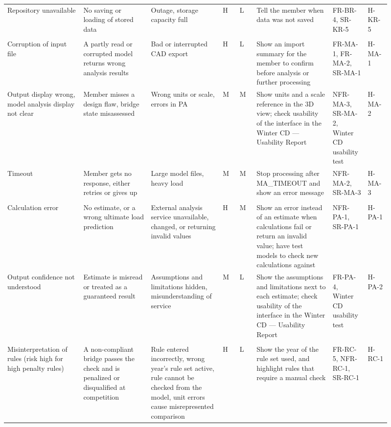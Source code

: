 \documentclass{article}
\begin{document}
\begin{landscape}
{\begin{longtable}{P{0.18\linewidth}P{0.165\linewidth}P{0.17\linewidth}>{\centering\arraybackslash}p{0.04\linewidth}>{\centering\arraybackslash}p{0.04\linewidth}P{0.185\linewidth}P{0.07\linewidth}P{0.055\linewidth}}
\cmidrule(l){1-8}
Repository unavailable & No saving or loading of stored data & Outage, storage capacity full & H & L & Tell the member when data was not saved & FR-BR-4, SR-KR-5 & H-KR-5\\
\\*
Corruption of input file & A partly read or corrupted model returns wrong analysis results & Bad or interrupted CAD export & H & L & Show an import summary for the member to confirm before analysis or further processing & FR-MA-1, FR-MA-2, SR-MA-1 & H-MA-1\\
\cmidrule(l){1-8}
Output display wrong, model analysis display not clear & Member misses a design flaw, bridge state misassessed & Wrong units or scale, errors in PA & M & M & Show units and a scale reference in the 3D view; check usability of the interface in the Winter CD --- Usability Report & NFR-MA-3, SR-MA-2, Winter CD usability test & H-MA-2\\
\cmidrule(l){1-8}
Timeout & Member gets no response, either retries or gives up & Large model files, heavy load & M & M & Stop processing after MA\_TIMEOUT and show an error message & NFR-MA-2, SR-MA-3 & H-MA-3\\
\\*
Calculation error & No estimate, or a wrong ultimate load prediction & External analysis service unavailable, changed, or returning invalid values & H & M & Show an error instead of an estimate when calculations fail or return an invalid value; have test models to check new calculations against & NFR-PA-1, SR-PA-1 & H-PA-1\\
\cmidrule(l){1-8}
Output confidence not understood & Estimate is misread or treated as a guaranteed result & Assumptions and limitations hidden, misunderstanding of service & M & L & Show the assumptions and limitations next to each estimate; check usability of the interface in the Winter CD --- Usability Report & FR-PA-4, Winter CD usability test & H-PA-2\\
\\*
Misinterpretation of rules (risk high for high penalty rules) & A non-compliant bridge passes the check and is penalized or disqualified at competition & Rule entered incorrectly, wrong year's rule set active, rule cannot be checked from the model, unit errors cause misrepresented comparison & H & L & Show the year of the rule set used, and highlight rules that require a manual check & FR-RC-5, NFR-RC-1, SR-RC-1 & H-RC-1\\

\end{longtable}}
\end{landscape}
\end{document}

